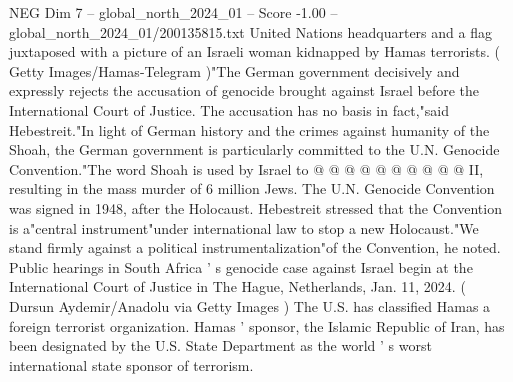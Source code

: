 \begin{textsample}{NEG Dim 7 – global\_north\_2024\_01 – Score -1.00 – global\_north\_2024\_01/200135815.txt}
United Nations headquarters and a flag juxtaposed with a picture of an Israeli woman kidnapped by Hamas terrorists. ( Getty Images/Hamas-Telegram )"The German government decisively and expressly rejects the accusation of genocide brought against Israel before the International Court of Justice.
The accusation has no basis in fact,"said Hebestreit."In light of German history and the crimes against humanity of the Shoah, the German government is particularly committed to the U.N.
Genocide Convention."The word Shoah is used by Israel to @ @ @ @ @ @ @ @ @ @ II, resulting in the mass murder of 6 million Jews.
The U.N.
Genocide Convention was signed in 1948, after the Holocaust.
Hebestreit stressed that the Convention is a"central instrument"under international law to stop a new Holocaust."We stand firmly against a political instrumentalization"of the Convention, he noted.
Public hearings in South Africa ' s genocide case against Israel begin at the International Court of Justice in The Hague, Netherlands, Jan. 11, 2024. ( Dursun Aydemir/Anadolu via Getty Images ) The U.S. has classified Hamas a foreign terrorist organization.
Hamas ' sponsor, the Islamic Republic of Iran, has been designated by the U.S.
State Department as the world ' s worst international state sponsor of terrorism.

\end{textsample}
